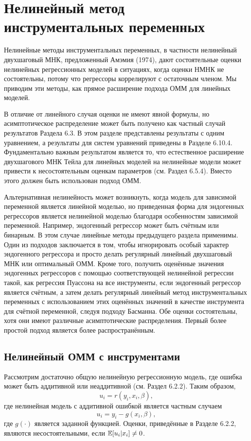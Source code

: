 \section{Нелинейный метод инструментальных переменных}
 
Нелинейные методы инструментальных переменных, в частности нелинейный двухшаговый МНК, предложенный Амэмия (1974), дают состоятельные оценки нелинейных регрессионных моделей в ситуациях, когда оценки НМНК не состоятельны, потому что регрессоры коррелируют с остаточным членом. Мы приводим эти методы, как прямое расширение подхода ОММ для линейных моделей.

В отличие от линейного случая оценки не имеют явной формулы, но асимптотическое распределение может быть получено как частный случай результатов Раздела 6.3. В этом разделе представлены результаты с одним уравнением, а результаты для систем уравнений приведены в Разделе 6.10.4. Фундаментально важным результатом является то, что естественное расширение двухшагового МНК Тейла для линейных моделей на нелинейные модели может привести к несостоятельным оценкам параметров (см. Раздел 6.5.4). Вместо этого должен быть использован подход ОММ.

Альтернативная нелинейность может возникнуть, когда модель для зависимой переменной является линейной моделью, но приведенная форма для эндогенных регрессоров является нелинейной моделью благодаря особенностям зависимой переменной. Например, эндогенный регрессор может быть счётным или бинарным. В этом случае линейные методы предыдущего раздела применимы. Один из подходов заключается в том, чтобы игнорировать особый характер эндогенного регрессора и просто делать регулярный линейный двухшаговый МНК или оптимальный ОММ. Кроме того, получить оценённые значения эндогенных регрессоров с помощью соответствующей нелинейной регрессии такой, как регрессия Пуассона на все инструменты, если эндогенный регрессор является счётным, а затем делать регулярный линейный метод инструментальных переменных с использованием этих оценённых значений в качестве инструмента для счётной переменной, следуя подходу Басманна. Обе оценки состоятельны, хотя они имеют различные асимптотические распределения. Первый более простой подход является более распространённым.

\subsection{Нелинейный ОММ с инструментами}

Рассмотрим достаточно общую нелинейную регрессионную модель, где ошибка может быть аддитивной или неаддитивной (см. Раздел 6.2.2). Таким образом,
\begin{equation}
u_i=r(y_i,x_i,\beta),
\end{equation}
где нелинейная модель с аддитивной ошибкой является частным случаем
\begin{equation}
u_i=y_i-g(x_i,\beta),
\end{equation}
где $g(\cdot)$ является заданной функцией. Оценки, приведённые в Разделе 6.2.2, являются несостоятельными, если $\mathbb{E}[u_i|x_i] \not=0$.

